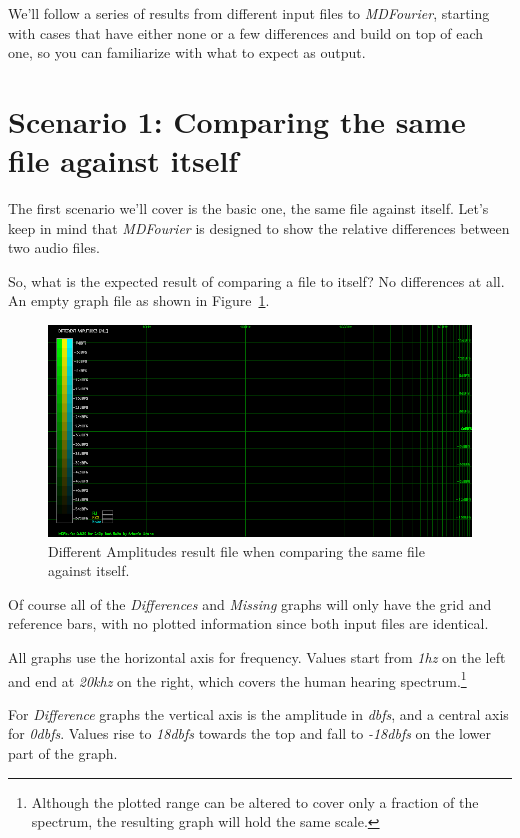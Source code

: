 \documentclass[10pt,a4paper]{report}
\newcommand{\ac}[1]{\textit{\mbox{\acrshort{#1}}}}
\newcommand{\hz}[1]{\textit{\mbox{#1\acrshort{hz}}}}
\newcommand{\khz}[1]{\textit{\mbox{#1\acrshort{khz}}}}
\newcommand{\db}[1]{\textit{\mbox{#1\acrshort{dbfs}}}}
\begin{document}
We'll follow a series of results from different input files to \textit{MDFourier}, starting with cases that have either none or a few differences and build on top of each one, so you can familiarize with what to expect as output.

\section{Scenario 1: Comparing the same file against itself}
\label{scenario1}

The first scenario we'll cover is the basic one, the same file against itself. Let's keep in mind that \textit{MDFourier} is designed to show the relative differences between two audio files.

So, what is the expected result of comparing a file to itself? No differences at all. An empty graph file as shown in Figure~\ref{fig:plot1-samefile}.

\begin{figure}[H]
	\centering
	\includegraphics[width=1.0\linewidth]{images/interpretation/Plot1-SameFile.png}
	\caption[Same file compared]{Different Amplitudes result file when comparing the same file against itself.}
	\label{fig:plot1-samefile}
\end{figure}

Of course all of the \textit{Differences} and \textit{Missing} graphs will only have the grid and reference bars, with no plotted information since both input files are identical.

All graphs use the horizontal axis for frequency. Values start from \hz{1} on the left and end at  \khz{20} on the right, which covers the human hearing spectrum.\footnote{Although the plotted range can be altered to cover only a fraction of the spectrum, the resulting graph will hold the same scale.}

For \textit{Difference} graphs the vertical axis is the amplitude in \ac{dbfs}, and a central axis for \db{0}. Values rise to \db{18} towards the top and fall to \db{-18} on the lower part of the graph.
\end{document}
